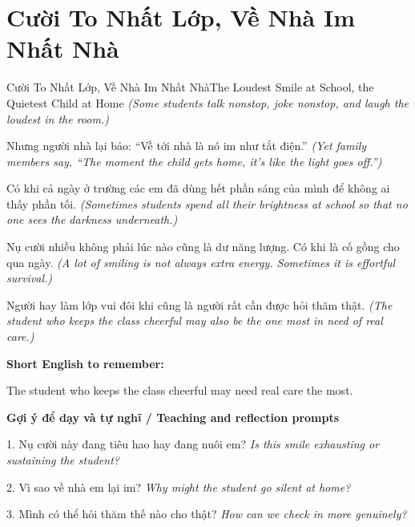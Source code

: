 \section{Cười To Nhất Lớp, Về Nhà Im Nhất Nhà}
\begin{truyen}{Cười To Nhất Lớp, Về Nhà Im Nhất Nhà}{The Loudest Smile at School, the Quietest Child at Home}
\textit{(Some students talk nonstop, joke nonstop, and laugh the loudest in the room.)}

Nhưng người nhà lại bảo: “Về tới nhà là nó im như tắt điện.”
\textit{(Yet family members say, “The moment the child gets home, it’s like the light goes off.”)}

Có khi cả ngày ở trường các em đã dùng hết phần sáng của mình để không ai thấy phần tối.
\textit{(Sometimes students spend all their brightness at school so that no one sees the darkness underneath.)}

Nụ cười nhiều không phải lúc nào cũng là dư năng lượng. Có khi là cố gồng cho qua ngày.
\textit{(A lot of smiling is not always extra energy. Sometimes it is effortful survival.)}

\end{truyen}

\begin{baihoc}
Người hay làm lớp vui đôi khi cũng là người rất cần được hỏi thăm thật.
\textit{(The student who keeps the class cheerful may also be the one most in need of real care.)}
\end{baihoc}

\begin{ghinhoanh}
\textbf{Short English to remember:}

The student who keeps the class cheerful may need real care the most.

\end{ghinhoanh}

\begin{tuhocnhanh}
\textbf{Gợi ý để dạy và tự nghĩ / Teaching and reflection prompts}

1. Nụ cười này đang tiêu hao hay đang nuôi em? \textit{Is this smile exhausting or sustaining the student?}

2. Vì sao về nhà em lại im? \textit{Why might the student go silent at home?}

3. Mình có thể hỏi thăm thế nào cho thật? \textit{How can we check in more genuinely?}
\end{tuhocnhanh}
\ngancach


